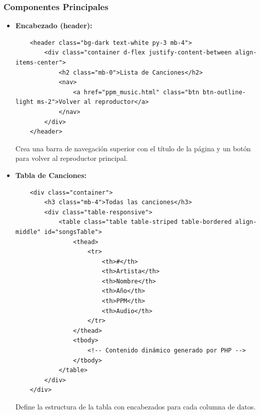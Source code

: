 \documentclass[a4paper,12pt]{article}
\begin{document}
\subsubsection{Componentes Principales}
\begin{itemize}
    \item \textbf{Encabezado (header):}
    \begin{verbatim}
    <header class="bg-dark text-white py-3 mb-4">
        <div class="container d-flex justify-content-between align-items-center">
            <h2 class="mb-0">Lista de Canciones</h2>
            <nav>
                <a href="ppm_music.html" class="btn btn-outline-light ms-2">Volver al reproductor</a>
            </nav>
        </div>
    </header>
    \end{verbatim}
    Crea una barra de navegación superior con el título de la página y un botón para volver al reproductor principal.

    \item \textbf{Tabla de Canciones:}
    \begin{verbatim}
    <div class="container">
        <h3 class="mb-4">Todas las canciones</h3>
        <div class="table-responsive">
            <table class="table table-striped table-bordered align-middle" id="songsTable">
                <thead>
                    <tr>
                        <th>#</th>
                        <th>Artista</th>
                        <th>Nombre</th>
                        <th>Año</th>
                        <th>PPM</th>
                        <th>Audio</th>
                    </tr>
                </thead>
                <tbody>
                    <!-- Contenido dinámico generado por PHP -->
                </tbody>
            </table>
        </div>
    </div>
    \end{verbatim}
    Define la estructura de la tabla con encabezados para cada columna de datos.
\end{itemize}
\end{document}
